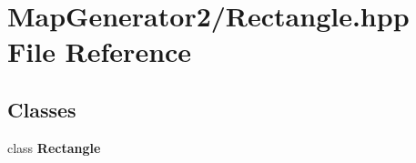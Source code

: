 \section{Map\-Generator2/\-Rectangle.hpp File Reference}
\label{_rectangle_8hpp}
\subsection*{Classes}
\begin{DoxyCompactItemize}
\item 
class {\bf Rectangle}
\end{DoxyCompactItemize}
